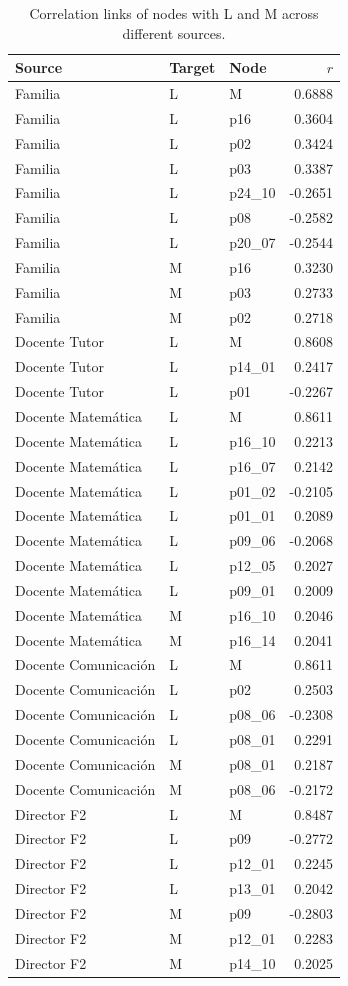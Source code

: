 \documentclass[11pt, a4paper]{article}
\begin{document}
\begin{table}[ht]
\centering
\begin{tabularx}{\textwidth}{l l l r}
\hline
Source & Target & Node & $r$ \\
\hline
Familia & L & M & 0.6888 \\
Familia & L & p16 & 0.3604 \\
Familia & L & p02 & 0.3424 \\
Familia & L & p03 & 0.3387 \\
Familia & L & p24\_10 & -0.2651 \\
Familia & L & p08 & -0.2582 \\
Familia & L & p20\_07 & -0.2544 \\
Familia & M & p16 & 0.3230 \\
Familia & M & p03 & 0.2733 \\
Familia & M & p02 & 0.2718 \\
\hline
Docente Tutor & L & M & 0.8608 \\
Docente Tutor & L & p14\_01 & 0.2417 \\
Docente Tutor & L & p01 & -0.2267 \\
\hline
Docente Matemática & L & M & 0.8611 \\
Docente Matemática & L & p16\_10 & 0.2213 \\
Docente Matemática & L & p16\_07 & 0.2142 \\
Docente Matemática & L & p01\_02 & -0.2105 \\
Docente Matemática & L & p01\_01 & 0.2089 \\
Docente Matemática & L & p09\_06 & -0.2068 \\
Docente Matemática & L & p12\_05 & 0.2027 \\
Docente Matemática & L & p09\_01 & 0.2009 \\
Docente Matemática & M & p16\_10 & 0.2046 \\
Docente Matemática & M & p16\_14 & 0.2041 \\
\hline
Docente Comunicación & L & M & 0.8611 \\
Docente Comunicación & L & p02 & 0.2503 \\
Docente Comunicación & L & p08\_06 & -0.2308 \\
Docente Comunicación & L & p08\_01 & 0.2291 \\
Docente Comunicación & M & p08\_01 & 0.2187 \\
Docente Comunicación & M & p08\_06 & -0.2172 \\
\hline
Director F2 & L & M & 0.8487 \\
Director F2 & L & p09 & -0.2772 \\
Director F2 & L & p12\_01 & 0.2245 \\
Director F2 & L & p13\_01 & 0.2042 \\
Director F2 & M & p09 & -0.2803 \\
Director F2 & M & p12\_01 & 0.2283 \\
Director F2 & M & p14\_10 & 0.2025 \\
\hline
\end{tabularx}
\caption{Correlation links of nodes with L and M across different sources.}
\end{table}
\end{document}
